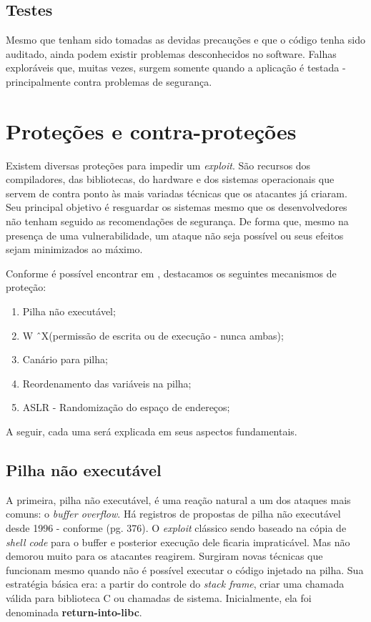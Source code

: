 		\subsection{Testes}
			Mesmo que tenham sido tomadas as devidas precauções e que o código tenha sido auditado,
			ainda podem existir problemas desconhecidos no software. Falhas exploráveis que, muitas vezes,
			surgem somente quando a aplicação é testada - principalmente contra problemas de segurança.
			

		
	
	\section{Proteções e contra-proteções}
	\label{sec:exploit_protection}
		Existem diversas proteções para impedir um \textsl{exploit}.
		São recursos dos compiladores, das bibliotecas, do hardware e dos sistemas operacionais
		que servem de contra ponto às mais variadas técnicas que os atacantes já criaram.
		Seu principal objetivo é resguardar os sistemas mesmo que os desenvolvedores
		não tenham seguido as recomendações de segurança. De forma que, mesmo na presença de uma
		vulnerabilidade, um ataque não seja possível ou seus efeitos sejam minimizados ao máximo.
		
		
		Conforme é possível encontrar em \cite{Anley2007}, destacamos os seguintes mecanismos
		de proteção:
		\begin{enumerate}
			\item{Pilha não executável;}
			\item{W \^\ X(permissão de escrita ou de execução - nunca ambas);}
			\item{Canário para pilha;}
			\item{Reordenamento das variáveis na pilha;}
			\item{ASLR - Randomização do espaço de endereços;}
		\end{enumerate}

		
		A seguir, cada uma será explicada em seus aspectos fundamentais.
		\subsection{Pilha não executável}
			A primeira, pilha não executável, é uma reação natural a um dos ataques mais comuns:
			o \textsl{buffer overflow}. Há registros de propostas de pilha não executável desde 1996 -
			conforme \cite{Anley2007}(pg. 376). O \textsl{exploit} clássico sendo baseado na cópia
			de \textsl{shell code} para o buffer e posterior execução dele ficaria impraticável.
			Mas não demorou muito para os atacantes reagirem. Surgiram novas técnicas que funcionam
			mesmo quando não é possível executar o código injetado na pilha.
			Sua estratégia básica era: a partir do controle do \textsl{stack frame}, criar uma chamada
			válida para biblioteca C ou chamadas de sistema. Inicialmente, ela foi denominada \textbf{return-into-libc}.
			
